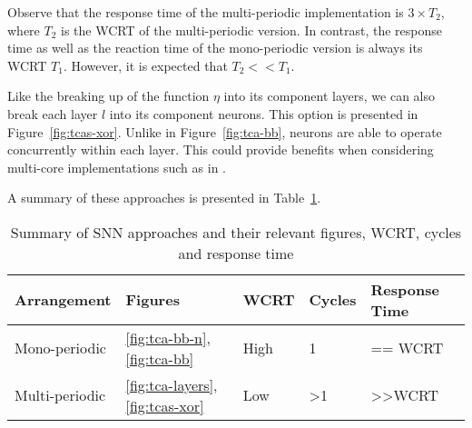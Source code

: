 Observe that the response time of the multi-periodic implementation is
$3 \times T_2$, where $T_2$ is the \ac{WCRT} of the multi-periodic
version. In contrast, the response time as well as the reaction time
of the mono-periodic version is always its \ac{WCRT} $T_1$. However, it is
expected that $T_2 << T_1$.

Like the breaking up of the function $\eta$ into its component
layers, we can also break each layer $l$ into its component neurons.
This option is presented in Figure~\ref{fig:tcas-xor}. 
Unlike in Figure~\ref{fig:tca-bb}, neurons are able to operate concurrently within each layer. 
This could provide benefits when considering multi-core
implementations such as in \cite{yuan2011compiling}.

A summary of these approaches is presented in Table~\ref{tbl:sann-approaches}.
\begin{table}[h]
	\centering
	\caption{Summary of \ac{SNN} approaches and their relevant figures, \ac{WCRT}, cycles and response time}
	\label{tbl:sann-approaches}
	\begin{tabular}{|l|l|l|l|l|}
		\hline
		Arrangement    & Figures & WCRT & Cycles & Response Time   \\ \hline
		Mono-periodic  & \ref{fig:tca-bb-n},\ref{fig:tca-bb} & High & 1 & == WCRT              \\
		Multi-periodic & \ref{fig:tca-layers},\ref{fig:tcas-xor}& Low  & \textgreater{}1 & \textgreater{}\textgreater{}WCRT \\ \hline
	\end{tabular}
\end{table}



